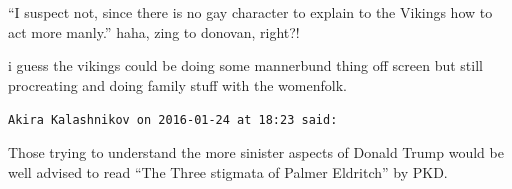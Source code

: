\begin{footnotesize}
\begin{sffamily}
``I suspect not, since there is no gay character to explain to the Vikings how to act more manly.'' haha, zing to donovan, right?!

i guess the vikings could be doing some mannerbund thing off screen but still procreating and doing family stuff with the womenfolk.

\hfill

\texttt{Akira Kalashnikov on 2016-01-24 at 18:23 said:}

Those trying to understand the more sinister aspects of Donald Trump would be well advised to read ``The Three stigmata of Palmer Eldritch'' by PKD.

\end{sffamily}
\end{footnotesize}

